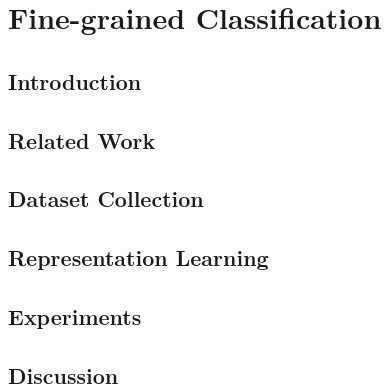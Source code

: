 
\chapter{Fine-grained Classification}

\section{Introduction}
\section{Related Work}
\section{Dataset Collection}
\section{Representation Learning}
\section{Experiments}
\section{Discussion}


\noindent 

%
%
%
%

